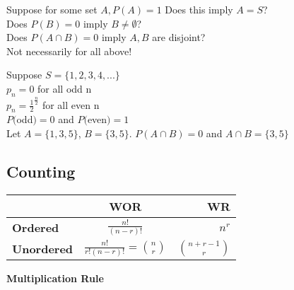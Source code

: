 \documentclass[12pt, oneside, letterpaper]{notes}
\begin{document}
\begin{myex}
\begin{remark}
	\noindent Suppose for some set $A, P(A) = 1$ Does this imply $A=S$? \\
	Does $P(B) = 0$ imply $B \neq \emptyset$? \\
	Does $P(A \cap B) = 0$ imply $A,B$ are disjoint? \\
	Not necessarily for all above! \\
	\vspace{3pt}
	
	\noindent Suppose $S = \{1,2,3,4,... \}$ \\
	$p_n = 0$ for all odd n \\
	$p_n = \frac{1}{2}^{\frac{n}{2}}$ for all even n \\
	$P($odd$) = 0$ and $P($even$) = 1$ \\
	Let $A=\{1,3,5\}$, $B=\{3,5\}$.  $P(A \cap B) = 0$ and $A \cap B = \{3,5\}$

\end{remark}

\end{myex}

\subsection{Counting}
%
%

\begin{table}[h!]
	\begin{center}
		\begin{tabular}{l|c|r}
			& \textbf{WOR} & \textbf{WR} \\
			\hline
			
			\textbf{Ordered} 
			& $ \frac{n!}{(n-r)!} $ 
			& $ n^r $ \\
			
			\textbf{Unordered} 
			& $ \frac{n!}{r!(n-r)!} = {n \choose r} $ 
			& $ {n+r-1 \choose r} $ \\

		\end{tabular}
	\end{center}
\end{table}


\begin{mydef}
	\textbf{Multiplication Rule} 
\end{mydef}	
\end{document}
